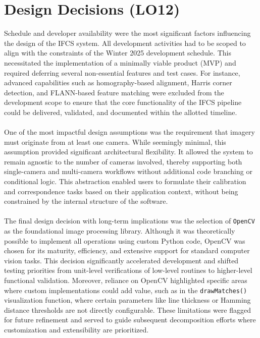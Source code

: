 \documentclass{article}
\begin{document}
\section{Design Decisions (LO12)}
Schedule and developer availability were the most significant factors influencing the design of the IFCS system. All development activities had to be scoped to align with the constraints of the Winter 2025 development schedule. This necessitated the implementation of a minimally viable product (MVP) and required deferring several non-essential features and test cases. For instance, advanced capabilities such as homography-based alignment, Harris corner detection, and FLANN-based feature matching were excluded from the development scope to ensure that the core functionality of the IFCS pipeline could be delivered, validated, and documented within the allotted timeline.
\\
\\
One of the most impactful design assumptions was the requirement that imagery must originate from at least one camera. While seemingly minimal, this assumption provided significant architectural flexibility. It allowed the system to remain agnostic to the number of cameras involved, thereby supporting both single-camera and multi-camera workflows without additional code branching or conditional logic. This abstraction enabled users to formulate their calibration and correspondence tasks based on their application context, without being constrained by the internal structure of the software.
\\
\\
The final design decision with long-term implications was the selection of \texttt{OpenCV} as the foundational image processing library. Although it was theoretically possible to implement all operations using custom Python code, OpenCV was chosen for its maturity, efficiency, and extensive support for standard computer vision tasks. This decision significantly accelerated development and shifted testing priorities from unit-level verifications of low-level routines to higher-level functional validation. Moreover, reliance on OpenCV highlighted specific areas where custom implementations could add value, such as in the \texttt{drawMatches()} visualization function, where certain parameters like line thickness or Hamming distance thresholds are not directly configurable. These limitations were flagged for future refinement and served to guide subsequent decomposition efforts where customization and extensibility are prioritized.
\end{document}
